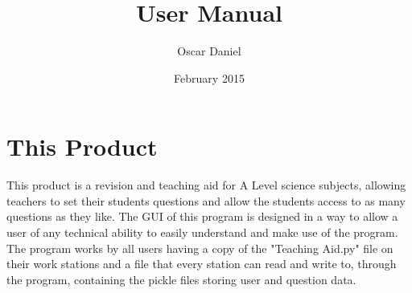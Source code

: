 \documentclass{report}
\title{User Manual}
\author{Oscar Daniel}
\date{February 2015}
\begin{document}
 
\maketitle
 
\tableofcontents
 
\chapter{This Product}
 This product is a revision and teaching aid for A Level science subjects, allowing teachers to set their students questions and allow the students access to as many questions as they like. The GUI of this program is designed in a way to allow a user of any technical ability to easily understand and make use of the program.\\
 The program works by all users having a copy of the "Teaching Aid.py" file on their work stations and a file that every station can read and write to, through the program, containing the pickle files storing user and question data.
 


 
\end{document}
